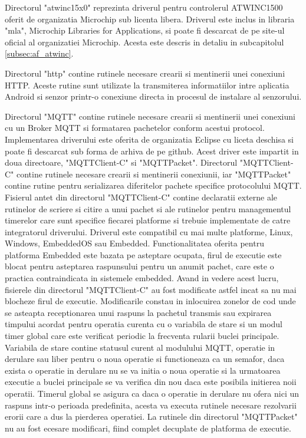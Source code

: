 Directorul "atwinc15x0" reprezinta driverul pentru controlerul ATWINC1500 oferit de organizatia Microchip sub licenta libera. Driverul este inclus in libraria 
"mla", Microchip Libraries for Applications, si poate fi descarcat de pe site-ul oficial al organizatiei Microchip. Acesta este descris in detaliu in subcapitolul
\ref{subsec:af_atwinc}.

Directorul "http" contine rutinele necesare crearii si mentinerii unei conexiuni HTTP. Aceste rutine sunt utilizate la transmiterea informatiilor intre aplicatia 
Android si senzor printr-o conexiune directa in procesul de instalare al senzorului.

Directorul "MQTT" contine rutinele necesare crearii si mentinerii unei conexiuni cu un Broker MQTT si formatarea pachetelor conform acestui protocol. Implementarea 
driverului este oferita de organizatia Eclipse cu liceta deschisa si poate fi descarcat sub forma de arhiva de pe github. Acest driver este impartit in doua directoare, 
"MQTTClient-C" si "MQTTPacket". Directorul "MQTTClient-C" contine rutinele necesare crearii si mentinerii conexiunii, iar "MQTTPacket" contine rutine pentru serializarea 
diferitelor pachete specifice protocolului MQTT. Fisierul antet din directorul "MQTTClient-C" contine declaratii externe ale rutinelor de scriere si citire a unui pachet si 
ale rutinelor pentru managementul timerelor care sunt specifice fiecarei platforme si trebuie implementate de catre integratorul driverului. Driverul este compatibil cu 
mai multe platforme, Linux, Windows, EmbeddedOS sau Embedded. Functionalitatea oferita pentru platforma Embedded este bazata pe asteptare ocupata, firul de executie 
este blocat pentru asteptarea raspunsului pentru un anumit pachet, care este o practica contraindicata in sistemele embedded. Avand in vedere acest lucru, fisierele 
din directorul "MQTTClient-C" au fost modificate astfel incat sa nu mai blocheze firul de executie. Modificarile constau in inlocuirea zonelor de cod unde se asteapta 
receptionarea unui raspuns la pachetul transmis sau expirarea timpului acordat pentru operatia curenta cu o variabila de stare si un modul timer global care este 
verificat periodic la frecventa rularii buclei principale. Variabila de stare contine statusul curent al modulului MQTT, operatie in derulare sau liber pentru 
o noua operatie si functioneaza ca un semafor, daca exista o operatie in derulare nu se va initia o noua operatie si la urmatoarea executie a buclei principale se va 
verifica din nou daca este posibila initierea noii operatii. Timerul global se asigura ca daca o operatie in derulare nu ofera nici un raspuns intr-o perioada 
predefinita, acesta va executa rutinele necesare rezolvarii erorii care a dus la pierderea operatiei. La rutinele din directorul "MQTTPacket" nu au fost ecesare 
modificari, fiind complet decuplate de platforma de executie. 

